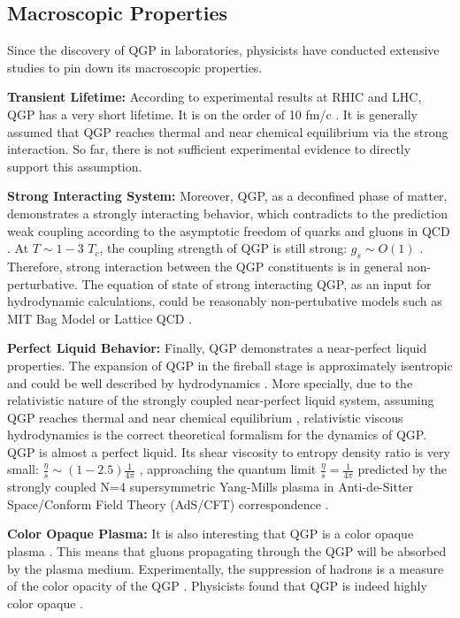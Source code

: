 \subsection{Macroscopic Properties}

Since the discovery of QGP in laboratories, physicists have conducted extensive studies to pin down its macroscopic properties. 

\textbf{Transient Lifetime:} According to experimental results at RHIC and LHC, QGP has a very short lifetime. It is on the order of 10 fm/c \cite{QGPLifeTime}. It is generally assumed that QGP reaches thermal \cite{QGPThermal} and near chemical equilibrium \cite{QGPChemical} via the strong interaction. So far, there is not sufficient experimental evidence to directly support this assumption.

\textbf{Strong Interacting System:} Moreover, QGP, as a deconfined phase of matter, demonstrates a strongly interacting behavior, which contradicts to the prediction weak coupling according to the asymptotic freedom of quarks and gluons in QCD \cite{QCDAsym}. At $T \sim 1 - 3$ $T_c$, the coupling strength of QGP is still strong: $g_s \sim O(1)$ \cite{sQGP}. Therefore, strong interaction between the QGP constituents is in general non-perturbative. The equation of state of strong interacting QGP, as an input for hydrodynamic calculations, could be reasonably non-pertubative models such as MIT Bag Model or Lattice QCD \cite{LatticeEOS}. 

\textbf{Perfect Liquid Behavior:} Finally, QGP demonstrates a near-perfect liquid properties. The expansion of QGP in the fireball stage is approximately isentropic and could be well described by hydrodynamics \cite{Bjorken}. More specially, due to the relativistic nature of the strongly coupled near-perfect liquid system, assuming QGP reaches thermal \cite{QGPThermal} and near chemical equilibrium \cite{QGPChemical}, relativistic viscous hydrodynamics \cite{4DHydro} is the correct theoretical formalism for the dynamics of QGP. QGP is almost a perfect liquid. Its shear viscosity to entropy density ratio is very small: $\frac{\eta}{s}\sim (1 - 2.5) \frac{1}{4\pi}$ \cite{QGPEtaOverS}, approaching the quantum limit $\frac{\eta}{s} = \frac{1}{4\pi}$ predicted by the strongly coupled N=4 supersymmetric Yang-Mills plasma in Anti-de-Sitter Space/Conform Field Theory (AdS/CFT) correspondence \cite{ADSCFT}.

\textbf{Color Opaque Plasma:} It is also interesting that QGP is a color opaque plasma \cite{QGPGen}. This means that gluons propagating through the QGP will be absorbed by the plasma medium. Experimentally, the suppression of hadrons is a measure of the color opacity of the QGP \cite{QGPGen}. Physicists found that QGP is indeed highly color opaque \cite{QGPOpaque}.


